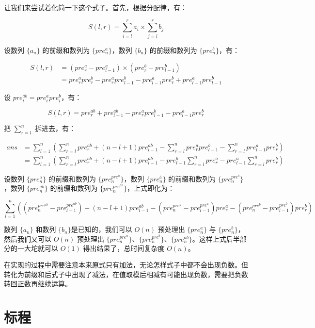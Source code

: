 \documentclass{../cpct/ctsol}
\begin{document}
让我们来尝试着化简一下这个式子。首先，根据分配律，有：

$$S(l,r) = \sum_{i=l}^ra_i \times \sum_{j=l}^rb_j$$

设数列 $\{a_n\}$ 的前缀和数列为 $\{pre^a_n\}$，数列 $\{b_n\}$ 的前缀和数列为 $\{pre^b_n\}$，有：

\begin{align*}
    S(l,r) & = \left( pre^a_r - pre^a_{l-1} \right) \times \left( pre^b_r - pre^b_{l-1} \right)      \\
           & = pre^a_rpre^b_r - pre^a_rpre^b_{l-1} - pre^a_{l-1}pre^b_r + pre^a_{l-1}pre^b_{l-1}
\end{align*}

设 $pre^{ab}_i = pre^a_ipre^b_i$，有：

$$S(l,r) = pre^{ab}_r + pre^{ab}_{l-1} - pre^a_rpre^b_{l-1} - pre^a_{l-1}pre^b_r$$

把 $\sum_{r=l}^n$ 拆进去，有：

\begin{align*}
    ans & = \sum_{l=1}^n \left( \sum_{r=l}^n pre^{ab}_r + (n-l+1)pre^{ab}_{l-1} - \sum_{r=l}^n pre^a_rpre^b_{l-1} - \sum_{r=l}^n pre^a_{l-1}pre^b_r \right) \\
        & = \sum_{l=1}^n \left( \sum_{r=l}^n pre^{ab}_r + (n-l+1)pre^{ab}_{l-1} - pre^b_{l-1}\sum_{r=l}^n pre^a_r - pre^a_{l-1}\sum_{r=l}^n pre^b_r \right)
\end{align*}

设数列 $\{pre^a_n\}$ 的前缀和数列为 $\{pre^{pre^a}_n\}$，数列 $\{pre^b_n\}$ 的前缀和数列为 $\{pre^{pre^b}_n\}$，数列 $\{pre^{ab}_n\}$ 的前缀和数列为 $\{pre^{pre^{ab}}_n\}$，上式即化为：

{
    \small
    $$
        \sum_{l=1}^n \left(
        \left(pre^{pre^{ab}}_n - pre^{pre^{ab}}_{l-1}\right) +
        (n-l+1)pre^{ab}_{l-1} -
        \left(pre^{pre^a}_n - pre^{pre^a}_{l-1}\right)pre^a_r -
        \left(pre^{pre^b}_n - pre^{pre^b}_{l-1}\right)pre^b_r
        \right)
    $$
}

数列 $\{a_n\}$ 和数列 $\{b_n\}$是已知的，我们可以 $O(n)$ 预处理出 $\{pre^a_n\}$ 与 $\{pre^b_n\}$，然后我们又可以 $O(n)$ 预处理出 $\{pre^{pre^a}_n\}$、$\{pre^{pre^b}_n\}$、$\{pre^{ab}_n\}$。这样上式后半部分的一大坨就可以 $O(1)$ 得出结果了，总时间复杂度 $O(n)$。

在实现的过程中需要注意本来原式只有加法，无论怎样式子中都不会出现负数。但转化为前缀和后式子中出现了减法，在值取模后相减有可能出现负数，需要把负数转回正数再继续运算。

\section*{标程}
\end{document}
